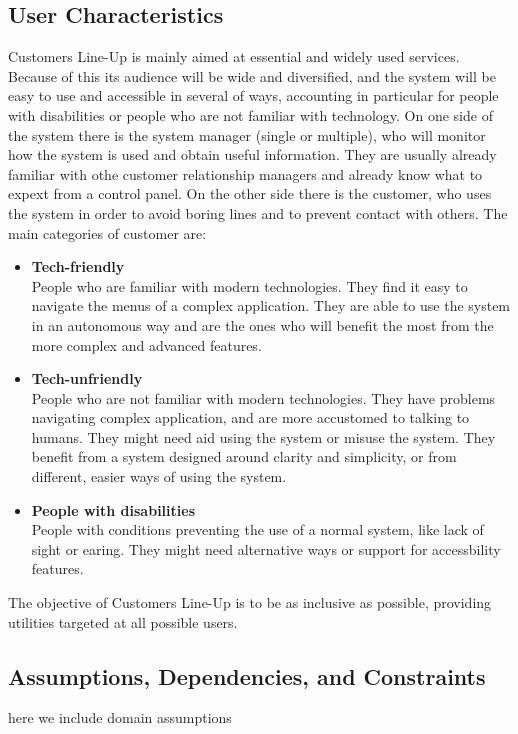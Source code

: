\subsection{User Characteristics}
Customers Line-Up is mainly aimed at essential and widely used services.
Because of this its audience will be wide and diversified, and the system will be easy to use and accessible in several of ways, accounting in particular for people with disabilities or people who are not familiar with technology.
On one side of the system there is the system manager (single or multiple), who will monitor how the system is used and obtain useful information.
They are usually already familiar with othe customer relationship managers and already know what to expext from a control panel.
On the other side there is the customer, who uses the system in order to avoid boring lines and to prevent contact with others.
The main categories of customer are:
\begin{itemize}
    \item \textbf{Tech-friendly}\\
        People who are familiar with modern technologies. They find it easy to navigate the menus of a complex application.
        They are able to use the system in an autonomous way and are the ones who will benefit the most from the more complex and advanced features.
    \item \textbf{Tech-unfriendly}\\
        People who are not familiar with modern technologies. They have problems navigating complex application, and are more accustomed to talking to humans.
        They might need aid using the system or misuse the system. They benefit from a system designed around clarity and simplicity, or from different, easier ways of using the system.
    \item \textbf{People with disabilities}\\
        People with conditions preventing the use of a normal system, like lack of sight or earing. They might need alternative ways or support for accessbility features.
\end{itemize}

The objective of Customers Line-Up is to be as inclusive as possible, providing utilities targeted at all possible users.

\subsection{Assumptions, Dependencies, and Constraints}
here we include domain assumptions 